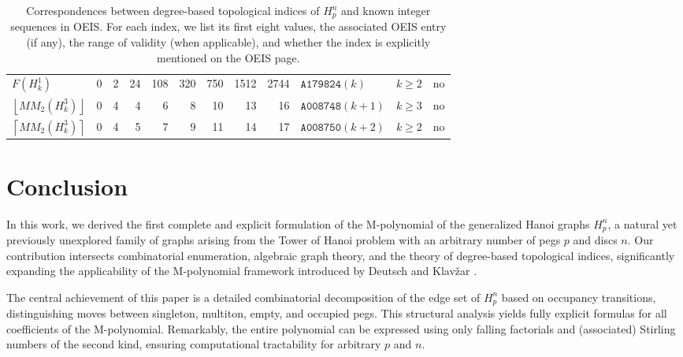 \documentclass[letterpaper,12pt]{article}
\begin{document}
\begin{table}[H]
{\begin{tabular}{@{}l|rrrrrrrrlcc@{}}
$F(H_{k}^{1})$                                & 0  & 2  & 24  & 108  & 320  & 750  & 1512  & 2744  & $\texttt{A179824}(k)$   & $k\geq2$                      & no                            \\
$\left\lfloor MM_{2}(H_{k}^{3})\right\rfloor$ & 0  & 4  & 4   & 6    & 8    & 10   & 13    & 16    & $\texttt{A008748}(k+1)$ & $k\geq3$                      & no                            \\
$\left\lceil MM_{2}(H_{k}^{3})\right\rceil$   & 0  & 4  & 5   & 7    & 9    & 11   & 14    & 17    & $\texttt{A008750}(k+2)$ & $k\geq2$                      & no                            \\ \bottomrule
\end{tabular}
}
\caption{Correspondences between degree-based topological indices of
$H_{p}^{n}$ and known integer sequences in OEIS.  
For each index, we list its first eight values, the associated OEIS entry
(if any), the range of validity (when applicable), and whether the index is 
explicitly mentioned on the OEIS page.}
\label{tab:oeis}
\end{table}

 
\section{Conclusion}\label{sec:conclusion}

In this work, we derived the first complete and explicit formulation of the M-polynomial of the
generalized Hanoi graphs $H_p^n$, a natural yet previously unexplored family of graphs arising
from the Tower of Hanoi problem with an arbitrary number of pegs $p $ and discs $n$.
Our contribution intersects combinatorial enumeration, algebraic graph theory, and the theory of
degree-based topological indices, significantly expanding the applicability of the M-polynomial
framework introduced by Deutsch and Klavžar \cite{EmericMploy}.

The central achievement of this paper is a detailed combinatorial decomposition of the edge set of
$H_p^n$ based on occupancy transitions, distinguishing moves between singleton, multiton, empty,
and occupied pegs. This structural analysis yields fully explicit formulas for all coefficients of the
M-polynomial. Remarkably, the entire polynomial can be expressed using only falling factorials and
(associated) Stirling numbers of the second kind, ensuring  computational
tractability for arbitrary $p$ and $n$.
\end{document}
